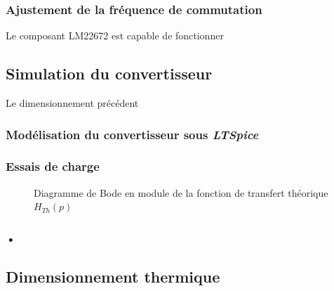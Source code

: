 			\subsubsection{Ajustement de la fréquence de commutation}
			
			Le composant LM22672 est capable de fonctionner 
			
			\subsection{Simulation du convertisseur}
			
			Le dimensionnement précédent
			
				\subsubsection{Modélisation du convertisseur sous \textit{LTSpice}}
				
				\subsubsection{Essais de charge}
				
				\begin{figure}[h]
\begin{center}
\end{center}
\label{filtre_th}
\caption{Diagramme de Bode en module de la fonction de transfert théorique $H_{Th}(p)$}
\end{figure}
				
				\subsubsection{•}
				
			
			\subsection{Dimensionnement thermique}
			
